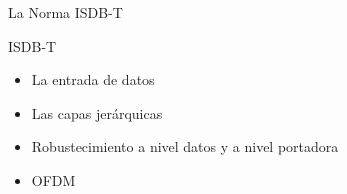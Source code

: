 \begin{frame}{La Norma ISDB-T}
	\begin{block}{ISDB-T}
	\begin{itemize}	
		\item {	La entrada de datos}
		\item { Las capas jerárquicas}
		\item {	Robustecimiento a nivel datos y a nivel portadora}
		\item { OFDM }
	\end{itemize}
\end{block}
\end{frame}

